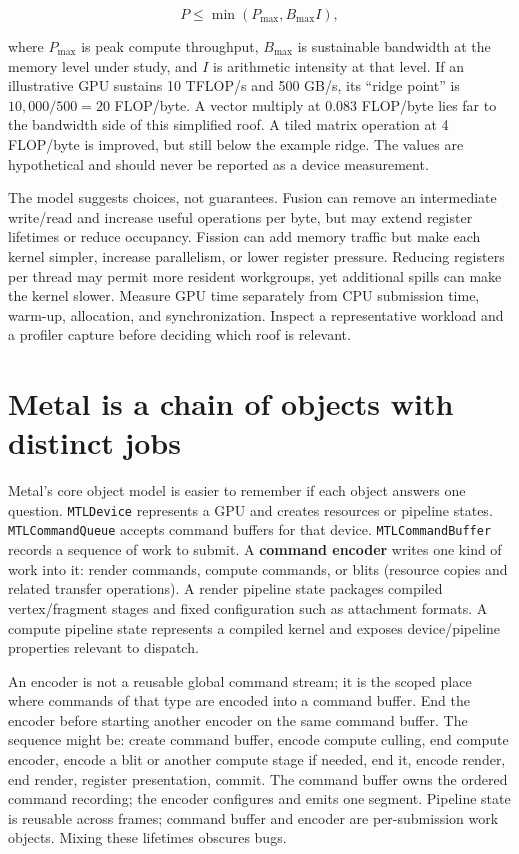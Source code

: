 \[
P\le \min(P_{\max}, B_{\max} I),
\]

where \(P_{\max}\) is peak compute throughput, \(B_{\max}\) is sustainable bandwidth at the memory level under study, and \(I\) is arithmetic intensity at that level. If an illustrative GPU sustains 10 TFLOP/s and 500 GB/s, its ``ridge point'' is \(10{,}000/500=20\) FLOP/byte. A vector multiply at 0.083 FLOP/byte lies far to the bandwidth side of this simplified roof. A tiled matrix operation at 4 FLOP/byte is improved, but still below the example ridge. The values are hypothetical and should never be reported as a device measurement.

The model suggests choices, not guarantees. Fusion can remove an intermediate write/read and increase useful operations per byte, but may extend register lifetimes or reduce occupancy. Fission can add memory traffic but make each kernel simpler, increase parallelism, or lower register pressure. Reducing registers per thread may permit more resident workgroups, yet additional spills can make the kernel slower. Measure GPU time separately from CPU submission time, warm-up, allocation, and synchronization. Inspect a representative workload and a profiler capture before deciding which roof is relevant.

\section{Metal is a chain of objects with distinct jobs}\label{01-foundations-i-ch011-metal-is-a-chain-of-objects-with-distinct-jobs}

Metal's core object model is easier to remember if each object answers one question. \texttt{MTLDevice} represents a GPU and creates resources or pipeline states. \texttt{MTLCommandQueue} accepts command buffers for that device. \texttt{MTLCommandBuffer} records a sequence of work to submit. A \textbf{command encoder} writes one kind of work into it: render commands, compute commands, or blits (resource copies and related transfer operations). A render pipeline state packages compiled vertex/fragment stages and fixed configuration such as attachment formats. A compute pipeline state represents a compiled kernel and exposes device/pipeline properties relevant to dispatch.

An encoder is not a reusable global command stream; it is the scoped place where commands of that type are encoded into a command buffer. End the encoder before starting another encoder on the same command buffer. The sequence might be: create command buffer, encode compute culling, end compute encoder, encode a blit or another compute stage if needed, end it, encode render, end render, register presentation, commit. The command buffer owns the ordered command recording; the encoder configures and emits one segment. Pipeline state is reusable across frames; command buffer and encoder are per-submission work objects. Mixing these lifetimes obscures bugs.


